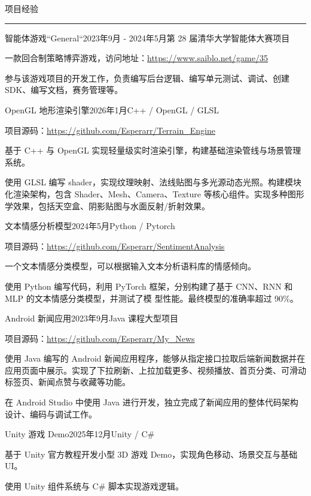 \documentclass{resume} %
\renewenvironment{rSection}[1]{
\sectionskip
\textcolor{TsinghuaPurple}{\MakeUppercase{#1}}
\sectionlineskip
\hrule
\begin{list}{}{
\setlength{\leftmargin}{0em}
}
\item[]
}{
\end{list}
}
\begin{document}
\begin{rSection}{项目经验}

\begin{rSubsection}{智能体游戏``General``}{2023年9月 - 2024年5月}{第 28 届清华大学智能体大赛项目}{}
\item 一款回合制策略博弈游戏，访问地址：\url{https://www.saiblo.net/game/35}
\item 参与该游戏项目的开发工作，负责编写后台逻辑、编写单元测试、调试、创建 SDK、编写文档，赛务管理等。
\end{rSubsection}  

\begin{rSubsection}{OpenGL 地形渲染引擎}{2026年1月}{C++ / OpenGL / GLSL}{}
\item 项目源码：\url{https://github.com/Esperarr/Terrain_Engine}
\item 基于 C++ 与 OpenGL 实现轻量级实时渲染引擎，构建基础渲染管线与场景管理系统。
\item 使用 GLSL 编写 shader，实现纹理映射、法线贴图与多光源动态光照。构建模块化渲染架构，包含 Shader、Mesh、Camera、Texture 等核心组件。实现多种图形学效果，包括天空盒、阴影贴图与水面反射/折射效果。
\end{rSubsection}

\begin{rSubsection}{文本情感分析模型}{2024年5月}{Python / Pytorch }{} 
\item 项目源码：\url{https://github.com/Esperarr/SentimentAnalysis}
\item 一个文本情感分类模型，可以根据输入文本分析语料库的情感倾向。
\item 使用 Python 编写代码，利用 PyTorch 框架，分别构建了基于 CNN、RNN 和 MLP 的文本情感分类模型，并测试了模
型性能。最终模型的准确率超过 90\%。
\end{rSubsection}

\begin{rSubsection}{Android 新闻应用}{2023年9月}{Java 课程大型项目}{}
\item 项目源码：\url{https://github.com/Esperarr/My_News}
\item 使用 Java 编写的 Android 新闻应用程序，能够从指定接口拉取后端新闻数据并在应用页面中展示。实现了下拉刷新、上拉加载更多、视频播放、首页分类、可滑动标签页、新闻点赞与收藏等功能。
\item 在 Android Studio 中使用 Java 进行开发，独立完成了新闻应用的整体代码架构设计、编码与调试工作。
\end{rSubsection}

\begin{rSubsection}{Unity 游戏 Demo}{2025年12月}{Unity / C\#}{}
\item 基于 Unity 官方教程开发小型 3D 游戏 Demo，实现角色移动、场景交互与基础 UI。
\item 使用 Unity 组件系统与 C\# 脚本实现游戏逻辑。
\end{rSubsection}


\end{rSection}
\end{document}
